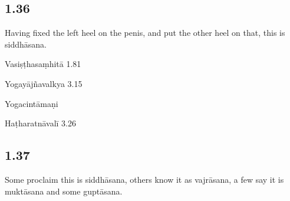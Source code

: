 \begin{ekdosis}
\subsection*{1.36}
\begin{translation}[hp01_036]
Having fixed the left heel on the penis, and put the other heel on that, this is siddhāsana.
\end{translation}

\begin{sources}[hp01_036]
Vasiṣṭhasaṃhitā 1.81

\begin{versinnote}
\end{versinnote}

Yogayājñavalkya 3.15

\begin{versinnote}
\end{versinnote}

\end{sources}

\begin{testimonia}[hp01_036]
Yogacintāmaṇi

\begin{versinnote}
\end{versinnote}

Haṭharatnāvalī 3.26

\begin{versinnote}
\end{versinnote}

\end{testimonia}

\subsection*{1.37}
\begin{translation}[hp01_037]
Some proclaim this is siddhāsana, others know it as vajrāsana, a few say it is muktāsana and some guptāsana.
\end{translation}


\end{ekdosis}
